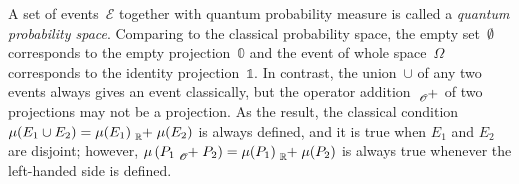 \documentclass{article}
\theoremstyle{remark}
\newcommand{\events}{\ensuremath{\mathcal{E}}}
\newcommand{\pmeas}{\ensuremath{\mu}}
\begin{document}
A set of events~$\events$ together with quantum probability measure is called a
\emph{quantum probability space}. 
Comparing to the classical probability space, the empty set~$\emptyset$
corresponds to the empty projection~$\mathbb{0}$ and the event of
whole space~$\Omega$ corresponds to the identity projection~$\mathbb{1}$.
In contrast, the union~$\cup$ of any two events always gives an
event classically, but the operator addition~$\tensor*[_{\mathscr{O}}]{+}{}$
of two projections may not be a projection. As the result, the classical
condition~$\pmeas(E_{1}\cup E_{2})=\pmeas(E_{1})\tensor*[_{\mathbb{R}}]{+}{}\pmeas(E_{2})$
is always defined, and it is true when $E_{1}$ and $E_{2}$ are disjoint;
however, $\mu\left(P_{1}\tensor*[_{\mathscr{O}}]{+}{}P_{2}\right)=\mu(P_{1})\tensor*[_{\mathbb{R}}]{+}{}\mu(P_{2})$
is always true whenever the left-handed side is defined.
\end{document}
